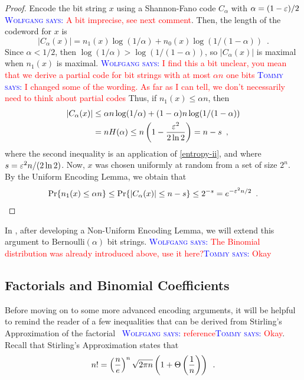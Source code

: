 \documentclass{patmorin}
\newcommand{\aremark}[3]{\textcolor{blue}{\textsc{#1 #2:}}
  \textcolor{red}{\textsf{#3}}}
\newcommand{\tommy}[2][says]{\aremark{Tommy}{#1}{#2}}
\newcommand{\wolfgang}[2][says]{\aremark{Wolfgang}{#1}{#2}}
\begin{document}
\begin{proof}
  Encode the bit string $x$ using a Shannon-Fano code $C_\alpha$ with
  $\alpha=(1-\varepsilon)/2$ \wolfgang{A bit imprecise, see next comment}.
  Then, the length of the codeword for $x$ is
  \[
    |C_\alpha(x)| = n_1(x)\log(1/\alpha) + n_0(x)\log (1/(1-\alpha))
    \enspace .
  \]
  Since $\alpha < 1/2$, then $\log(1/\alpha) > \log(1/(1-\alpha))$, so
  $|C_\alpha(x)|$ is maximal when $n_1(x)$ is maximal. \wolfgang{I
    find this a bit unclear, you mean that we derive a partial code
    for bit strings with at most $\alpha n$ one bits} \tommy{I changed
    some of the wording. As far as I can tell, we don't necessarily
    need to think about partial codes} Thus, if $n_1(x) \le \alpha n$,
  then
  \begin{align*}
    |C_\alpha(x)| & \le \alpha n\log(1/\alpha) + (1-\alpha)n\log(1/(1-\alpha))\\
                  & = n H(\alpha) \le n\left(1-\frac{\varepsilon^2}{2\ln 2}\right) = n - s \enspace ,
  \end{align*}
  where the second inequality is an application of \eqref{entropy-ii},
  and where $s = \varepsilon^2 n/(2 \ln 2)$.  Now, $x$ was chosen uniformly at
  random from a set of size $2^n$. By the Uniform Encoding Lemma, we
  obtain that
  \[
    \Pr\{n_1(x) \leq \alpha n\} \le \Pr\{|C_\alpha(x)| \le n - s\} \le 2^{-s} = e^{-\varepsilon^2n/2} \enspace . \qedhere
  \]
\end{proof}
In , after developing a Non-Uniform Encoding Lemma,
we will extend this argument to $\mathrm{Bernoulli}(\alpha)$ bit
strings. \wolfgang{The Binomial distribution was already introduced
  above, use it here?}\tommy{Okay}

\subsection{Factorials and Binomial Coefficients}

Before moving on to some more advanced encoding arguments, it will be
helpful to remind the reader of a few inequalities that can be derived
from Stirling's Approximation of the factorial~\cite{robbins:stirling}
\wolfgang{reference}\tommy{Okay}.  Recall that Stirling's
Approximation states that
\begin{equation}
  n! = \left(\frac{n}{e}\right)^n\sqrt{2\pi n}\left(1+\Theta\left(\frac{1}{n}\right)\right) \enspace .
  \eqlabel{stirling}
\end{equation}
\end{document}
